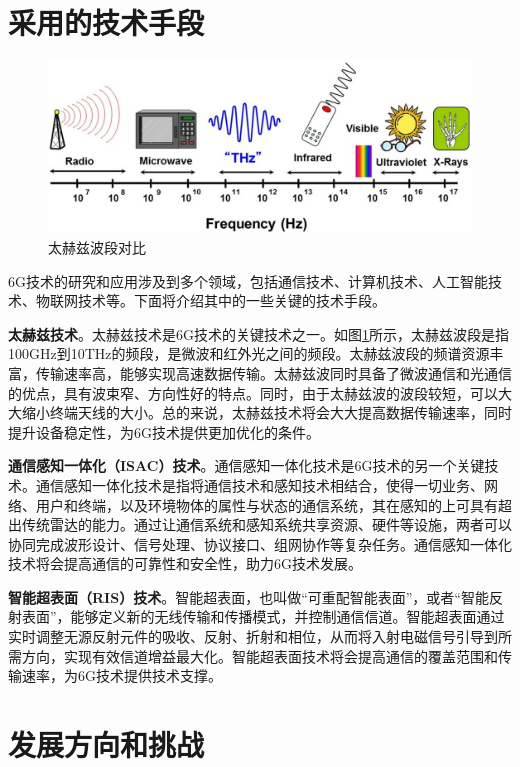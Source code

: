 \documentclass{article}
\begin{document}
\section{采用的技术手段}

\begin{figure}[tb]
    \centering
    \includegraphics[width=\textwidth]{pics/太赫兹.png}
    \caption{太赫兹波段对比}
    \label{fig:thz}
\end{figure}

6G技术的研究和应用涉及到多个领域，包括通信技术、计算机技术、人工智能技术、物联网技术等。下面将介绍其中的一些关键的技术手段。

\textbf{太赫兹技术}\cite{siegel2003thz}。太赫兹技术是6G技术的关键技术之一。如图\ref{fig:thz}所示，太赫兹波段是指100GHz到10THz的频段，是微波和红外光之间的频段。太赫兹波段的频谱资源丰富，传输速率高，能够实现高速数据传输。太赫兹波同时具备了微波通信和光通信的优点，具有波束窄、方向性好的特点。同时，由于太赫兹波的波段较短，可以大大缩小终端天线的大小。总的来说，太赫兹技术将会大大提高数据传输速率，同时提升设备稳定性，为6G技术提供更加优化的条件。

\textbf{通信感知一体化（ISAC）技术}\cite{dilling2014isac}。通信感知一体化技术是6G技术的另一个关键技术。通信感知一体化技术是指将通信技术和感知技术相结合，使得一切业务、网络、用户和终端，以及环境物体的属性与状态的通信系统，其在感知的上可具有超出传统雷达的能力。通过让通信系统和感知系统共享资源、硬件等设施，两者可以协同完成波形设计、信号处理、协议接口、组网协作等复杂任务。通信感知一体化技术将会提高通信的可靠性和安全性，助力6G技术发展。

\textbf{智能超表面（RIS）技术}\cite{liu2021reconfigurable}。智能超表面，也叫做“可重配智能表面”，或者“智能反射表面”，能够定义新的无线传输和传播模式，并控制通信信道。智能超表面通过实时调整无源反射元件的吸收、反射、折射和相位，从而将入射电磁信号引导到所需方向，实现有效信道增益最大化。智能超表面技术将会提高通信的覆盖范围和传输速率，为6G技术提供技术支撑。

\section{发展方向和挑战}
\end{document}
